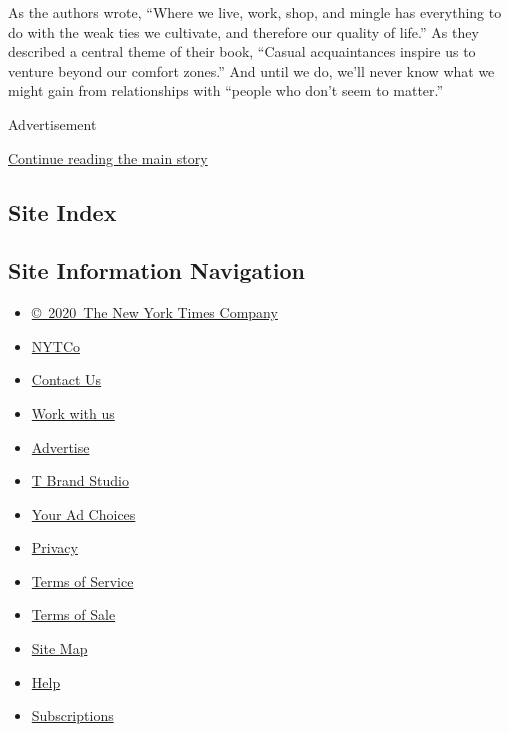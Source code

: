 As the authors wrote, ``Where we live, work, shop, and mingle has
everything to do with the weak ties we cultivate, and therefore our
quality of life.'' As they described a central theme of their book,
``Casual acquaintances inspire us to venture beyond our comfort zones.''
And until we do, we'll never know what we might gain from relationships
with ``people who don't seem to matter.''

Advertisement

\protect\hyperlink{after-bottom}{Continue reading the main story}

\hypertarget{site-index}{%
\subsection{Site Index}\label{site-index}}

\hypertarget{site-information-navigation}{%
\subsection{Site Information
Navigation}\label{site-information-navigation}}

\begin{itemize}
\tightlist
\item
  \href{https://help.nytimes.com/hc/en-us/articles/115014792127-Copyright-notice}{©~2020~The
  New York Times Company}
\end{itemize}

\begin{itemize}
\tightlist
\item
  \href{https://www.nytco.com/}{NYTCo}
\item
  \href{https://help.nytimes.com/hc/en-us/articles/115015385887-Contact-Us}{Contact
  Us}
\item
  \href{https://www.nytco.com/careers/}{Work with us}
\item
  \href{https://nytmediakit.com/}{Advertise}
\item
  \href{http://www.tbrandstudio.com/}{T Brand Studio}
\item
  \href{https://www.nytimes.com/privacy/cookie-policy\#how-do-i-manage-trackers}{Your
  Ad Choices}
\item
  \href{https://www.nytimes.com/privacy}{Privacy}
\item
  \href{https://help.nytimes.com/hc/en-us/articles/115014893428-Terms-of-service}{Terms
  of Service}
\item
  \href{https://help.nytimes.com/hc/en-us/articles/115014893968-Terms-of-sale}{Terms
  of Sale}
\item
  \href{https://spiderbites.nytimes.com}{Site Map}
\item
  \href{https://help.nytimes.com/hc/en-us}{Help}
\item
  \href{https://www.nytimes.com/subscription?campaignId=37WXW}{Subscriptions}
\end{itemize}
